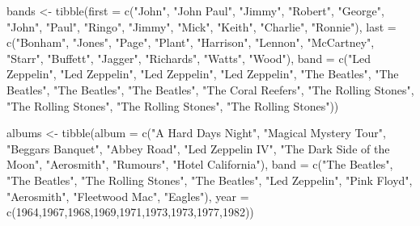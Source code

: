 \documentclass[
]{book}
\newenvironment{Shaded}{\begin{snugshade}}{\end{snugshade}}
\newcommand{\AttributeTok}[1]{\textcolor[rgb]{0.77,0.63,0.00}{#1}}
\newcommand{\DecValTok}[1]{\textcolor[rgb]{0.00,0.00,0.81}{#1}}
\newcommand{\FunctionTok}[1]{\textcolor[rgb]{0.00,0.00,0.00}{#1}}
\newcommand{\NormalTok}[1]{#1}
\newcommand{\OtherTok}[1]{\textcolor[rgb]{0.56,0.35,0.01}{#1}}
\newcommand{\StringTok}[1]{\textcolor[rgb]{0.31,0.60,0.02}{#1}}
\begin{document}
\begin{Shaded}
\begin{Highlighting}[]
\NormalTok{bands }\OtherTok{\textless{}{-}} \FunctionTok{tibble}\NormalTok{(}\AttributeTok{first =} \FunctionTok{c}\NormalTok{(}\StringTok{"John"}\NormalTok{, }\StringTok{"John Paul"}\NormalTok{, }\StringTok{"Jimmy"}\NormalTok{, }\StringTok{"Robert"}\NormalTok{, }\StringTok{"George"}\NormalTok{, }\StringTok{"John"}\NormalTok{, }
                          \StringTok{"Paul"}\NormalTok{, }\StringTok{"Ringo"}\NormalTok{, }\StringTok{"Jimmy"}\NormalTok{, }\StringTok{"Mick"}\NormalTok{, }\StringTok{"Keith"}\NormalTok{, }\StringTok{"Charlie"}\NormalTok{, }\StringTok{"Ronnie"}\NormalTok{), }
                \AttributeTok{last =} \FunctionTok{c}\NormalTok{(}\StringTok{"Bonham"}\NormalTok{, }\StringTok{"Jones"}\NormalTok{, }\StringTok{"Page"}\NormalTok{, }\StringTok{"Plant"}\NormalTok{, }\StringTok{"Harrison"}\NormalTok{, }\StringTok{"Lennon"}\NormalTok{,}
                         \StringTok{"McCartney"}\NormalTok{, }\StringTok{"Starr"}\NormalTok{, }\StringTok{"Buffett"}\NormalTok{, }\StringTok{"Jagger"}\NormalTok{, }\StringTok{"Richards"}\NormalTok{, }\StringTok{"Watts"}\NormalTok{, }\StringTok{"Wood"}\NormalTok{), }
                \AttributeTok{band =} \FunctionTok{c}\NormalTok{(}\StringTok{"Led Zeppelin"}\NormalTok{, }\StringTok{"Led Zeppelin"}\NormalTok{, }\StringTok{"Led Zeppelin"}\NormalTok{, }\StringTok{"Led Zeppelin"}\NormalTok{,}
                         \StringTok{"The Beatles"}\NormalTok{, }\StringTok{"The Beatles"}\NormalTok{, }\StringTok{"The Beatles"}\NormalTok{, }\StringTok{"The Beatles"}\NormalTok{,}
                         \StringTok{"The Coral Reefers"}\NormalTok{, }\StringTok{"The Rolling Stones"}\NormalTok{, }\StringTok{"The Rolling Stones"}\NormalTok{,}
                         \StringTok{"The Rolling Stones"}\NormalTok{, }\StringTok{"The Rolling Stones"}\NormalTok{))}

\NormalTok{albums }\OtherTok{\textless{}{-}} \FunctionTok{tibble}\NormalTok{(}\AttributeTok{album =} \FunctionTok{c}\NormalTok{(}\StringTok{"A Hard Day\textquotesingle{}s Night"}\NormalTok{, }\StringTok{"Magical Mystery Tour"}\NormalTok{, }\StringTok{"Beggar\textquotesingle{}s Banquet"}\NormalTok{,}
                           \StringTok{"Abbey Road"}\NormalTok{, }\StringTok{"Led Zeppelin IV"}\NormalTok{, }\StringTok{"The Dark Side of the Moon"}\NormalTok{, }\StringTok{"Aerosmith"}\NormalTok{,}
                           \StringTok{"Rumours"}\NormalTok{, }\StringTok{"Hotel California"}\NormalTok{),}
                 \AttributeTok{band =} \FunctionTok{c}\NormalTok{(}\StringTok{"The Beatles"}\NormalTok{, }\StringTok{"The Beatles"}\NormalTok{, }\StringTok{"The Rolling Stones"}\NormalTok{, }\StringTok{"The Beatles"}\NormalTok{, }
                          \StringTok{"Led Zeppelin"}\NormalTok{, }\StringTok{"Pink Floyd"}\NormalTok{, }\StringTok{"Aerosmith"}\NormalTok{, }\StringTok{"Fleetwood Mac"}\NormalTok{, }\StringTok{"Eagles"}\NormalTok{), }
                 \AttributeTok{year =} \FunctionTok{c}\NormalTok{(}\DecValTok{1964}\NormalTok{,}\DecValTok{1967}\NormalTok{,}\DecValTok{1968}\NormalTok{,}\DecValTok{1969}\NormalTok{,}\DecValTok{1971}\NormalTok{,}\DecValTok{1973}\NormalTok{,}\DecValTok{1973}\NormalTok{,}\DecValTok{1977}\NormalTok{,}\DecValTok{1982}\NormalTok{))}



\end{Highlighting}
\end{Shaded}
\end{document}
